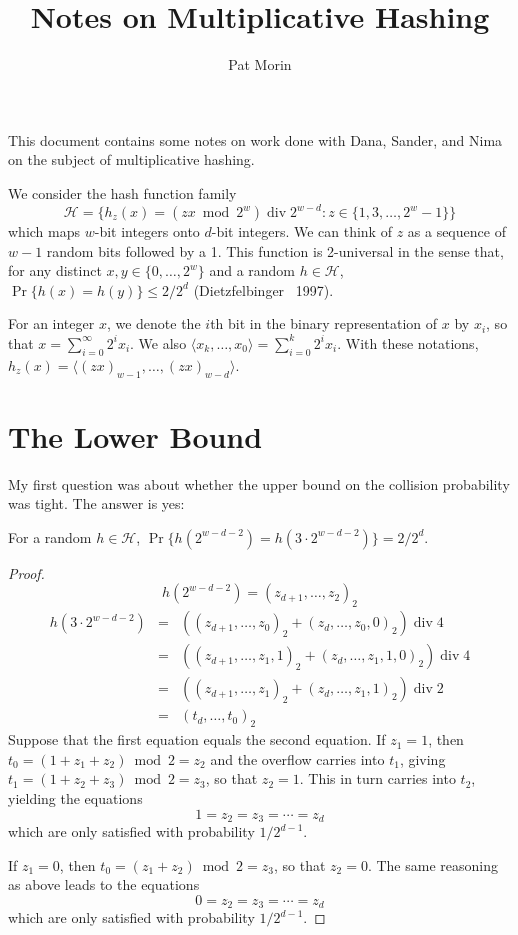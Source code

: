\documentclass{patmorin}
\title{Notes on Multiplicative Hashing}
\author{Pat Morin}
\newcommand{\HH}{\mathcal{H}}
\renewcommand{\div}{\mathop{\mathrm{div}}}
\begin{document}
\maketitle
This document contains some notes on work done with Dana, Sander, and
Nima on the subject of multiplicative hashing.

We consider the hash function family
\[
   \HH = \{ h_z(x) = (zx\bmod 2^w) \div 2^{w-d} : z \in\{1,3,\ldots,2^w-1 \} \}
\]
which maps $w$-bit integers onto $d$-bit integers. 
We can think of $z$ as a sequence of $w-1$ random bits followed by a 1.
This function is 2-universal in the sense that, for any distinct $x,y\in
\{0,\ldots,2^w\}$ and a random $h\in\HH$, $\Pr\{h(x)=h(y)\} \le 2/2^d$
(Dietzfelbinger \etal\ 1997).


For an integer $x$, we denote the $i$th bit in the binary representation of $x$ by $x_i$, so that $x=\sum_{i=0}^\infty 2^ix_i$.   We also $\langle x_k,\ldots,x_0\rangle=\sum_{i=0}^k 2^ix_i$.
With these notations, $h_z(x) = \langle (zx)_{w-1},\ldots,(zx)_{w-d}\rangle$.


\section{The Lower Bound}
My first question was about whether the upper bound on the collision
probability was tight.  The answer is yes:
\begin{clm}
  For a random $h\in\HH$, $\Pr\{h(2^{w-d-2}) = h(3\cdot2^{w-d-2})\}
   = 2/2^d$.
\end{clm}

\begin{proof}
\[ h(2^{w-d-2}) = (z_{d+1},\ldots,z_{2})_2 \]
\begin{eqnarray*} h(3\cdot 2^{w-d-2}) 
  &=& ((z_{d+1},\ldots,z_{0})_2  +  (z_{d},\ldots,z_{0},0)_2) \div 4 \\
  &=& ((z_{d+1},\ldots,z_1,1)_2  +  (z_{d},\ldots,z_1,1,0)_2) \div 4 \\
  &=& ((z_{d+1},\ldots,z_1)_2  +  (z_{d},\ldots,z_1,1)_2) \div 2 \\
  &=& (t_d,\ldots,t_0)_2
\end{eqnarray*}
Suppose that the first equation equals the second equation.
If $z_1=1$, then $t_0 = (1+z_1+z_2)\bmod 2 = z_2$ and the overflow carries into $t_1$, giving $t_1 = (1+z_2+z_3)\bmod 2 = z_3$, so that $z_2=1$.  This in turn carries into $t_2$, yielding the equations
\[
   1=z_2=z_3=\cdots=z_d
\]
which are only satisfied with probability $1/2^{d-1}$.

If $z_1=0$, then $t_0=(z_1+z_2)\bmod 2 = z_3$, so that $z_2=0$.  The same
reasoning as above leads to the equations
\[
   0=z_2=z_3=\cdots=z_d
\]
which are only satisfied with probability $1/2^{d-1}$.
\end{proof}
\end{document}
